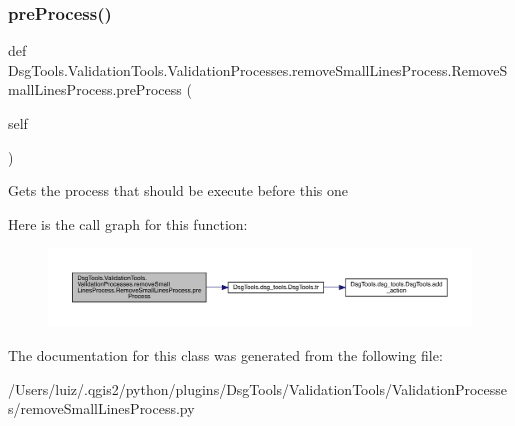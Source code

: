 \subsubsection{\texorpdfstring{pre\+Process()}{preProcess()}}
{\footnotesize\ttfamily def Dsg\+Tools.\+Validation\+Tools.\+Validation\+Processes.\+remove\+Small\+Lines\+Process.\+Remove\+Small\+Lines\+Process.\+pre\+Process (\begin{DoxyParamCaption}\item[{}]{self }\end{DoxyParamCaption})}

\begin{DoxyVerb}Gets the process that should be execute before this one
\end{DoxyVerb}
 Here is the call graph for this function\+:
\nopagebreak
\begin{figure}[H]
\begin{center}
\leavevmode
\includegraphics[width=350pt]{class_dsg_tools_1_1_validation_tools_1_1_validation_processes_1_1remove_small_lines_process_1_1_remove_small_lines_process_afa39dbf71d0204049a936d28af5de1c3_cgraph}
\end{center}
\end{figure}


The documentation for this class was generated from the following file\+:\begin{DoxyCompactItemize}
\item 
/\+Users/luiz/.\+qgis2/python/plugins/\+Dsg\+Tools/\+Validation\+Tools/\+Validation\+Processes/remove\+Small\+Lines\+Process.\+py\end{DoxyCompactItemize}
